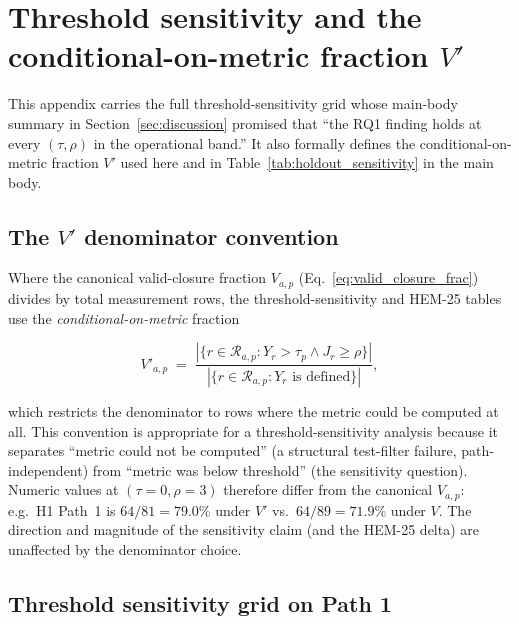 \section{Threshold sensitivity and the conditional-on-metric fraction $V'$}
\label{sec:appendix_threshold}

This appendix carries the full threshold-sensitivity grid whose main-body
summary in Section~\ref{sec:discussion} promised that ``the RQ1 finding
holds at every $(\tau, \rho)$ in the operational band.'' It also formally
defines the conditional-on-metric fraction $V'$ used here and in
Table~\ref{tab:holdout_sensitivity} in the main body.

\subsection{The $V'$ denominator convention}
\label{sec:appendix_vprime_defn}

Where the canonical valid-closure fraction $V_{a, p}$ (Eq.~\ref{eq:valid_closure_frac})
divides by total measurement rows, the threshold-sensitivity and HEM-25
tables use the \emph{conditional-on-metric} fraction

\begin{equation}
  V'_{a, p}
  \;=\;
  \frac{|\{r \in \mathcal{R}_{a, p} : Y_r > \tau_p \wedge J_r \geq \rho\}|}
       {|\{r \in \mathcal{R}_{a, p} : Y_r \text{ is defined}\}|},
  \label{eq:vprime}
\end{equation}

which restricts the denominator to rows where the metric could be computed
at all. This convention is appropriate for a threshold-sensitivity analysis
because it separates ``metric could not be computed'' (a structural
test-filter failure, path-independent) from ``metric was below threshold''
(the sensitivity question). Numeric values at $(\tau = 0, \rho = 3)$
therefore differ from the canonical $V_{a, p}$: e.g.\ H1 Path~1 is
$64/81 = 79.0\%$ under $V'$ vs.\ $64/89 = 71.9\%$ under $V$. The
direction and magnitude of the sensitivity claim (and the HEM-25 delta)
are unaffected by the denominator choice.

\subsection{Threshold sensitivity grid on Path 1}
\label{sec:appendix_threshold_grid}



